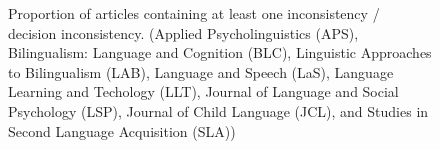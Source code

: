 \documentclass[
  doc,
  longtable,
  nolmodern,
  notxfonts,
  notimes,
  colorlinks=true,linkcolor=blue,citecolor=blue,urlcolor=blue]{apa7}
\begin{document}
\begin{figure}[H]

\caption{\label{fig-stacked-bar}Proportion of articles containing at
least one inconsistency / decision inconsistency. (Applied
Psycholinguistics (APS), Bilingualism: Language and Cognition (BLC),
Linguistic Approaches to Bilingualism (LAB), Language and Speech (LaS),
Language Learning and Techology (LLT), Journal of Language and Social
Psychology (LSP), Journal of Child Language (JCL), and Studies in Second
Language Acquisition (SLA))}


\end{figure}%
\end{document}
